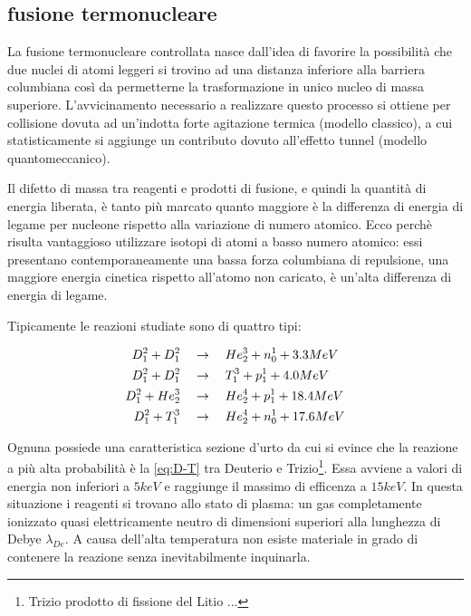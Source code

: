 



\subsection{fusione termonucleare}

La fusione termonucleare controllata nasce dall'idea di favorire la
possibilità che due nuclei di atomi leggeri si trovino ad una distanza
inferiore alla barriera columbiana così da permetterne la
trasformazione in unico nucleo di massa superiore. L'avvicinamento
necessario a realizzare questo processo si ottiene per collisione dovuta
ad un'indotta forte agitazione termica (modello classico), a cui
statisticamente si aggiunge un contributo dovuto all'effetto tunnel
(modello quantomeccanico).

Il difetto di massa tra reagenti e prodotti di fusione, e quindi la
quantità di energia liberata, è tanto più marcato quanto maggiore è la
differenza di energia di legame per nucleone rispetto alla variazione di
numero atomico. Ecco perchè risulta vantaggioso utilizzare isotopi di
atomi a basso numero atomico: essi presentano contemporaneamente una
bassa forza columbiana di repulsione, una maggiore energia cinetica
rispetto all'atomo non caricato, è un'alta differenza di energia di
legame. 

Tipicamente le reazioni studiate sono di quattro tipi:


\begin{align}
 D^2_1 + D^2_1 & \quad \rightarrow \quad  He^3_2 + n^1_0 + 3.3MeV \\
 D^2_1 + D^2_1 & \quad \rightarrow \quad  T^3_1 + p^1_1 + 4.0MeV \\
 D^2_1 + He^3_2    & \quad \rightarrow \quad  He^4_2 + p^1_1 + 18.4MeV \\
 D^2_1 + T^3_1   & \quad \rightarrow \quad  He^4_2 + n^1_0 + 17.6MeV
 \label{eq:D-T}
\end{align}

Ognuna possiede una caratteristica sezione d'urto da cui si evince che
la reazione a più alta probabilità è la \eqref{eq:D-T} tra Deuterio e
Trizio\footnote{Trizio prodotto di fissione del Litio ...}. Essa avviene
a valori di energia non inferiori a $5keV$ e raggiunge il massimo di
efficenza a $15keV$. In questa situazione i reagenti si trovano allo
stato di plasma: un gas completamente ionizzato quasi elettricamente
neutro di dimensioni superiori alla lunghezza di Debye
$\lambda_{De}$. A causa dell'alta temperatura non esiste materiale in
grado di contenere la reazione senza inevitabilmente inquinarla.

